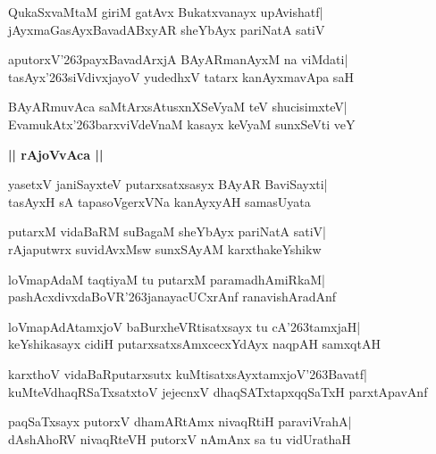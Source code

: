 \documentclass[twoside,12pt,openright]{book}
\def\S{\char'263}
\newcounter{shloka}[chapter]
\def\uvaca#1{\centerline{{\large\textbf{#1}}}}
\begin{document}
\begin{shloka}%
QukaSxvaMtaM giriM gatAvx Bukatxvanayx upAvishatf|\\
jAyxmaGasAyxBavadABxyAR sheYbAyx pariNatA satiV
\end{shloka}

\begin{shloka}%
aputorxV\S payxBavadArxjA BAyARmanAyxM na viMdati|\\
tasAyx\S siVdivxjayoV yudedhxV tatarx kanAyxmavApa saH
\end{shloka}

\begin{shloka}%
BAyARmuvAca saMtArxsAtusxnXSeVyaM teV shucisimxteV|\\
EvamukAtx\S barxviVdeVnaM kasayx keVyaM sunxSeVti veY
\end{shloka}

\uvaca{|| rAjoVvAca ||}
\begin{shloka}%
yasetxV janiSayxteV putarxsatxsasyx BAyAR BaviSayxti|\\
tasAyxH sA tapasoVgerxVNa kanAyxyAH samasUyata
\end{shloka}

\begin{shloka}%
putarxM vidaBaRM suBagaM sheYbAyx pariNatA satiV|\\
rAjaputwrx suvidAvxMsw sunxSAyAM karxthakeYshikw
\end{shloka}

\begin{shloka}%
loVmapAdaM taqtiyaM tu putarxM paramadhAmiRkaM|\\
pashAcxdivxdaBoVR\S janayacUCxrAnf ranavishAradAnf
\end{shloka}

\begin{shloka}%
loVmapAdAtamxjoV baBurxheVRtisatxsayx tu cA\S tamxjaH|\\
keYshikasayx cidiH putarxsatxsAmxcecxYdAyx naqpAH samxqtAH
\end{shloka}

\begin{shloka}%
karxthoV vidaBaRputarxsutx kuMtisatxsAyxtamxjoV\S Bavatf|\\
kuMteVdhaqRSaTxsatxtoV jejecnxV dhaqSATxtapxqqSaTxH parxtApavAnf
\end{shloka}

\begin{shloka}%
paqSaTxsayx putorxV dhamARtAmx nivaqRtiH paraviVrahA|\\
dAshAhoRV nivaqRteVH putorxV nAmAnx sa tu vidUrathaH
\end{shloka}
\end{document}
